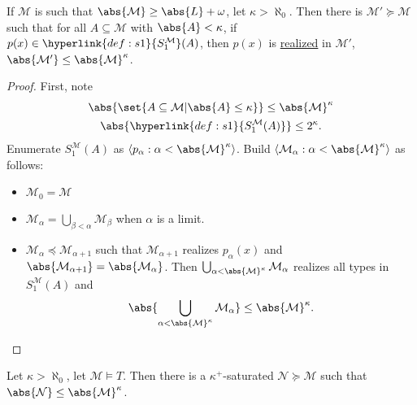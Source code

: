 \documentclass{article}
\let\models\vDash
\newcommand{\M}{\mathcal{M}}
\renewcommand{\N}{\mathcal{N}}
\begin{document}
\begin{lemma}
  If $\M$ is such that $\abs{\M} \geq \abs{L} + \omega$, let $\kappa > \aleph_0$.
  Then there is $\M' \succcurlyeq \M$ such that for all $A \subseteq \M$ with $\abs{A}< \kappa$, if $p(x) \in \hyperlink{def:s1}{S^\M_1}(A)$, then $p(x)$ is \hyperlink{def:type}{realized} in $\M'$, $\abs{\M'} \leq \abs{\M}^\kappa$.
\end{lemma}
\begin{proof}
  First, note
  \begin{gather*}
    \abs{\set{A \subseteq \M | \abs{A} \leq \kappa}} \leq \abs{\M}^\kappa \\
    \abs{\hyperlink{def:s1}{S_1^\M(A)}} \leq 2^\kappa.
  \end{gather*}
  Enumerate $S_1^\M(A)$ as $\langle p_\alpha : \alpha < \abs{\M}^\kappa \rangle$.
  Build $\langle \M_\alpha : \alpha < \abs{\M}^\kappa \rangle$ as follows:
  \begin{itemize}
    \item $\M_0 = \M$
    \item $\M_\alpha = \bigcup_{\beta < \alpha} \M_\beta$ when $\alpha$ is a limit.
  \item $\M_\alpha \preccurlyeq \M_{\alpha + 1}$ such that $\M_{\alpha+1}$ realizes $p_\alpha(x)$ and $\abs{\M_{\alpha+1}} = \abs{\M_\alpha}$.
    Then $\bigcup_{\alpha < \abs{\M}^\kappa} \M_\alpha$ realizes all types in $S_1^\M(A)$ and
    \begin{equation*}
    \abs{\bigcup_{\alpha < \abs{\M}^\kappa} \M_\alpha} \leq \abs{\M}^\kappa. \qedhere
    \end{equation*}
  \end{itemize}
\end{proof}
\begin{thm}
  Let $\kappa > \aleph_0$, let $\M \models T$. Then there is a $\kappa^+$-saturated $\mathcal{N} \succcurlyeq \M$ such that $\abs{\N} \leq \abs{\M}^\kappa$.
\end{thm}
\end{document}
